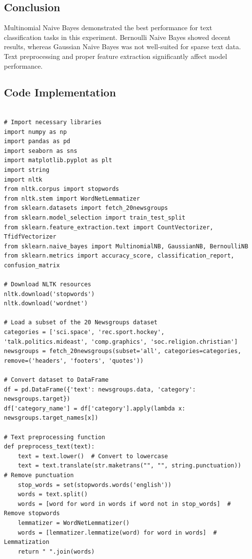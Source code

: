 \documentclass[a4paper,12pt]{article}
\begin{document}
\subsection{Conclusion}
Multinomial Naive Bayes demonstrated the best performance for text classification tasks in this experiment. Bernoulli Naive Bayes showed decent results, whereas Gaussian Naive Bayes was not well-suited for sparse text data. Text preprocessing and proper feature extraction significantly affect model performance.

\newpage
\subsection{Code Implementation}
\begin{lstlisting}[style=python]

# Import necessary libraries
import numpy as np
import pandas as pd
import seaborn as sns
import matplotlib.pyplot as plt
import string
import nltk
from nltk.corpus import stopwords
from nltk.stem import WordNetLemmatizer
from sklearn.datasets import fetch_20newsgroups
from sklearn.model_selection import train_test_split
from sklearn.feature_extraction.text import CountVectorizer, TfidfVectorizer
from sklearn.naive_bayes import MultinomialNB, GaussianNB, BernoulliNB
from sklearn.metrics import accuracy_score, classification_report, confusion_matrix

# Download NLTK resources
nltk.download('stopwords')
nltk.download('wordnet')

# Load a subset of the 20 Newsgroups dataset
categories = ['sci.space', 'rec.sport.hockey', 'talk.politics.mideast', 'comp.graphics', 'soc.religion.christian']
newsgroups = fetch_20newsgroups(subset='all', categories=categories, remove=('headers', 'footers', 'quotes'))

# Convert dataset to DataFrame
df = pd.DataFrame({'text': newsgroups.data, 'category': newsgroups.target})
df['category_name'] = df['category'].apply(lambda x: newsgroups.target_names[x])

# Text preprocessing function
def preprocess_text(text):
    text = text.lower()  # Convert to lowercase
    text = text.translate(str.maketrans("", "", string.punctuation))  # Remove punctuation
    stop_words = set(stopwords.words('english'))
    words = text.split()
    words = [word for word in words if word not in stop_words]  # Remove stopwords
    lemmatizer = WordNetLemmatizer()
    words = [lemmatizer.lemmatize(word) for word in words]  # Lemmatization
    return " ".join(words)


\end{lstlisting}
\end{document}
